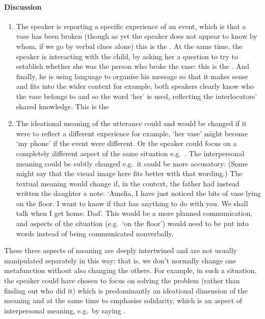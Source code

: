 \documentclass[letterpaper,10pt,english]{sphinxmanual}
\begin{document}
\paragraph{Discussion}
\label{\detokenize{content/session_00/Part_00_02:Discussion}}\begin{enumerate}
%
\item {} 
The speaker is reporting a specific experience of an event, which is that a vase has been broken (though as yet the speaker does not appear to know by whom, if we go by verbal clues alone) \textendash{} this is the . At the same time, the speaker is interacting with the child, by asking her a question to try to establish whether she was the person who broke the vase: this is the . And finally, he is using language to organise his message so that it
makes sense and fits into the wider context \textendash{} for example, both speakers clearly know who the vase belongs to and so the word ‘her’ is used, reflecting the interlocutors’ shared knowledge. This is the 

\item {} 
The ideational meaning of the utterance could and would be changed if it were to reflect a different experience \textendash{} for example, ‘her vase’ might become ‘my phone’ if the event were different. Or the speaker could focus on a completely different aspect of the same situation e.g. . The interpersonal meaning could be subtly changed e.g. it could be more accusatory:  (Some might say that the visual image here fits better with that wording.)
The textual meaning would change if, in the context, the father had instead written the daughter a note: ‘Amelia, I have just noticed the bits of vase lying on the floor. I want to know if that has anything to do with you. We shall talk when I get home. Dad’. This would be a more planned communication, and aspects of the situation (e.g. ‘on the floor’) would need to be put into words instead of being communicated non\sphinxhyphen{}verbally.

\end{enumerate}

These three aspects of meaning are deeply intertwined and are not usually manipulated separately in this way: that is, we don’t normally change one metafunction without also changing the others. For example, in such a situation, the speaker could have chosen to focus on solving the problem (rather than finding out who did it) \textendash{} which is predominantly an ideational dimension of the meaning and at the same time to emphasise solidarity, which is an aspect of interpersonal meaning, e.g. by saying
.
\end{document}
